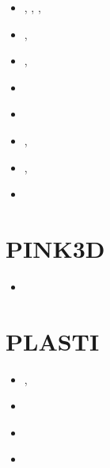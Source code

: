 \begin{small}
\begin{itemize}
                             \textcite{chbl13}
\item[\twothousandfourteen]    \textcite{frba14},  \textcite{gagb14}, 
                               \textcite{bufa14},  \textcite{bufy14b}
\item[\twothousandfifteen]     \textcite{wulc15},  \textcite{gebw15}
\item[\twothousandsixteen]     \textcite{marl16},  \textcite{jala16}
\item[\twothousandseventeen]   \textcite{petc17}
\item[\twothousandeighteen]    \textcite{gesr18}
\item[\twothousandnineteen]    \textcite{jala19},  \textcite{chjl19}
\item[\twothousandtwentyone]   \textcite{deol21},  \textcite{bamg21} 
\item[\twothousandtwentythree] \textcite{gojd23} 
\end{itemize}
\end{small}

\section{PINK3D}

\begin{small}
\begin{itemize}
\item[2015] \textcite{vosc15}
\end{itemize}
\end{small}

\section{PLASTI}

\begin{small}
\begin{itemize}
\item[\twothousandsix]       \textcite{fuwb06}, \textcite{fuwf06}
\item[\twothousandthirteen]  \textcite{cass13}
\item[\twothousandtwenty]    \textcite{femb20}
\item[\twothousandtwentyone] \textcite{femc21}
\end{itemize}
\end{small}

